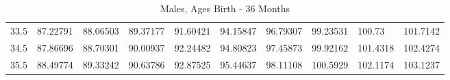 \documentclass[10pt,twocolumn,letterpaper]{article}
\begin{document}
\begin{table}
{\begin{tabular}{llllllllll}
    33.5            & 87.22791                               & 88.06503                               & 89.37177                                & 91.60421                                & 94.15847                                & 96.79307                                & 99.23531                                & 100.73                                  & 101.7142                                \\
    34.5            & 87.86696                               & 88.70301                               & 90.00937                                & 92.24482                                & 94.80823                                & 97.45873                                & 99.92162                                & 101.4318                                & 102.4274                                \\
    35.5            & 88.49774                               & 89.33242                               & 90.63786                                & 92.87525                                & 95.44637                                & 98.11108                                & 100.5929                                & 102.1174                                & 103.1237                                \\
    \end{tabular}
		}
    \caption {Males, Ages Birth - $36$ Months}
		
\end{table}
\end{document}
